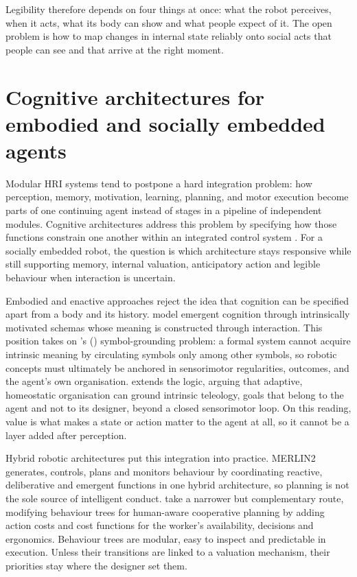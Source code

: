 Legibility therefore depends on four things at once: what the robot perceives, when it acts, what its body can show and what people expect of it. The open problem is how to map changes in internal state reliably onto social acts that people can see and that arrive at the right moment.

\section{Cognitive architectures for embodied and socially embedded agents}
\label{sec:soa-architectures}

Modular HRI systems tend to postpone a hard integration problem: how perception, memory, motivation, learning, planning, and motor execution become parts of one continuing agent instead of stages in a pipeline of independent modules. Cognitive architectures address this problem by specifying how those functions constrain one another within an integrated control system \citep{MoulinFrier2018DACH3,GonzalezSantamarta2025Hybrid}. For a socially embedded robot, the question is which architecture stays responsive while still supporting memory, internal valuation, anticipatory action and legible behaviour when interaction is uncertain.

Embodied and enactive approaches reject the idea that cognition can be specified apart from a body and its history. \citet{GeorgeonRitter2012Schema} model emergent cognition through intrinsically motivated schemas whose meaning is constructed through interaction. This position takes on \citeauthor{Harnad1990SymbolGrounding}'s (\citeyear{Harnad1990SymbolGrounding}) symbol-grounding problem: a formal system cannot acquire intrinsic meaning by circulating symbols only among other symbols, so robotic concepts must ultimately be anchored in sensorimotor regularities, outcomes, and the agent's own organisation. \citet{DiPaolo2003OrganismicallyInspired} extends the logic, arguing that adaptive, homeostatic organisation can ground intrinsic teleology, goals that belong to the agent and not to its designer, beyond a closed sensorimotor loop. On this reading, value is what makes a state or action matter to the agent at all, so it cannot be a layer added after perception.

Hybrid robotic architectures put this integration into practice. MERLIN2 \citep{GonzalezSantamarta2025Hybrid} generates, controls, plans and monitors behaviour by coordinating reactive, deliberative and emergent functions in one hybrid architecture, so planning is not the sole source of intelligent conduct. \citet{Fusaro2021HumanAwareBT} take a narrower but complementary route, modifying behaviour trees for human-aware cooperative planning by adding action costs and cost functions for the worker's availability, decisions and ergonomics. Behaviour trees are modular, easy to inspect and predictable in execution. Unless their transitions are linked to a valuation mechanism, their priorities stay where the designer set them.

